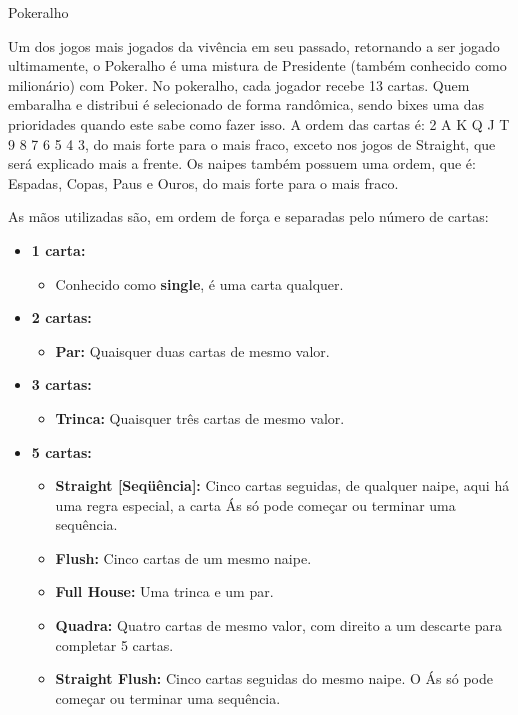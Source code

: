 \begin{subsecao}{Pokeralho}

Um dos jogos mais jogados da vivência em seu passado, retornando a ser jogado ultimamente, o
Pokeralho é uma mistura de Presidente (também conhecido como milionário) com
Poker. No pokeralho, cada jogador recebe 13 cartas. Quem embaralha e distribui é
selecionado de forma randômica, sendo bixes uma das prioridades quando este sabe
como fazer isso. A ordem das cartas é: 2 A K Q J T 9 8 7 6 5 4 3, do mais forte
para o mais fraco, exceto nos jogos de Straight, que será explicado mais a
frente. Os naipes também possuem uma ordem, que é: Espadas, Copas, Paus e Ouros,
do mais forte para o mais fraco.

As mãos utilizadas são, em ordem de força e separadas pelo número de cartas:
\begin{itemize}

\item \textbf {1 carta:}
\begin{itemize}
\item Conhecido como \textbf{single}, é uma carta qualquer.
\end{itemize}
\item \textbf {2 cartas:}
\begin{itemize}

\item \textbf{Par:} Quaisquer duas cartas de mesmo valor.
\end{itemize}
\pagebreak
\item \textbf {3 cartas:}

\begin{itemize}
\item \textbf{Trinca:} Quaisquer três cartas de mesmo valor.
\end{itemize}
\item \textbf {5 cartas:}

\begin{itemize}
\item \textbf{Straight [Seqüência]:} Cinco cartas seguidas, de qualquer naipe,
aqui há uma regra especial, a carta Ás só pode começar ou terminar uma
sequência.
\item \textbf{Flush:} Cinco cartas de um mesmo naipe.
\item \textbf{Full House:} Uma trinca e um par.
\item \textbf{Quadra:} Quatro cartas de mesmo valor, com direito a um descarte
para completar 5 cartas.
\item \textbf{Straight Flush:} Cinco cartas seguidas do mesmo naipe. O Ás só
pode começar ou terminar uma sequência. 
\end{itemize}


\end{itemize}
\end{subsecao}

